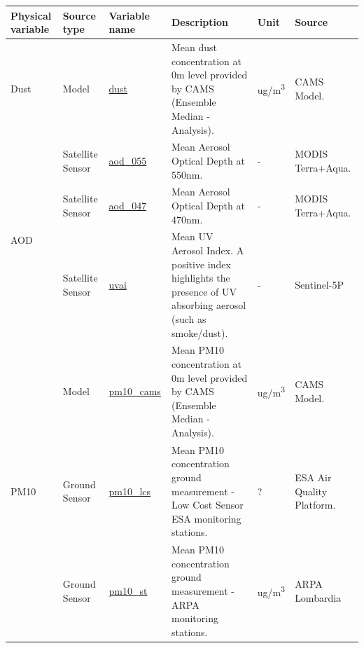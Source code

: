 \begin{center}
\setlength{\arrayrulewidth}{1.5pt}
\begin{longtable}{ |p{2cm}|p{1.5cm}|p{2.3cm}|p{4cm}|p{1cm}|p{2cm}| } 
\hline
\textbf{Physical variable} & \textbf{Source type}  & \textbf{Variable name}  & \textbf{Description}  & \textbf{Unit}  & \textbf{Source}\\ 
\hline
\multirow{1}{4em}{Dust} & Model  & \underline{dust} & Mean dust concentration at 0m level provided by CAMS (Ensemble Median - Analysis). & ug/m\textsuperscript{3} & CAMS Model.\\ \hline

\multirow{3}{4em}{AOD} & Satellite \newline Sensor  & \underline{aod\_055} & Mean Aerosol Optical Depth at 550nm. & - & MODIS Terra+Aqua.\\ 
& Satellite \newline Sensor  & \underline{aod\_047} &  Mean Aerosol Optical Depth at 470nm. & - & MODIS Terra+Aqua.\\ 
& Satellite \newline Sensor & \underline{uvai} &  Mean UV Aerosol Index. A positive index highlights the presence of UV absorbing aerosol (such as smoke/dust).  & - & Sentinel-5P\\ \hline

\multirow{3}{4em}{PM10} & Model  & \underline{pm10\_cams} & Mean PM10 concentration at 0m level provided by CAMS  (Ensemble Median - Analysis). & ug/m\textsuperscript{3} & CAMS Model.\\ 
& Ground \newline Sensor  & \underline{pm10\_lcs} &  Mean PM10 concentration ground measurement - Low Cost Sensor ESA monitoring stations. & ? & ESA Air Quality Platform.\\ 
& Ground \newline Sensor & \underline{pm10\_st} &  Mean PM10 concentration ground measurement - ARPA monitoring stations.  & ug/m\textsuperscript{3} & ARPA \newline Lombardia\\ \hline


\end{longtable}
\end{center}
